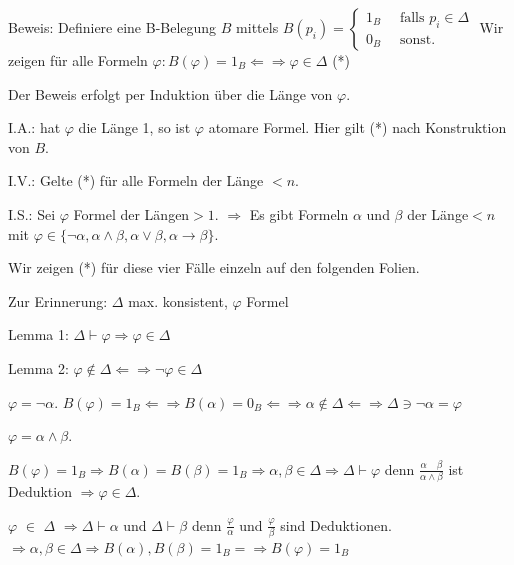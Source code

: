 \documentclass[a4paper]{article}
\begin{document}
\begin{multicols}{3}
  Beweis: Definiere eine B-Belegung $B$ mittels
  $B(p_i) = \begin{cases} 1_B \quad\text{ falls } p_i\in\Delta \\ 0_B \quad\text{ sonst. } \end{cases}$
  Wir zeigen für alle Formeln
  $\varphi: B(\varphi) = 1_B \Leftarrow\Rightarrow\varphi\in\Delta$ (*)

  Der Beweis erfolgt per Induktion über die Länge von $\varphi$.

  \begin{enumerate*}
    \itemsep1pt\parskip0pt
    \item
          I.A.: hat $\varphi$ die Länge 1, so ist $\varphi$ atomare Formel. Hier
          gilt (*) nach Konstruktion von $B$.
    \item
          I.V.: Gelte (*) für alle Formeln der Länge $<n$.
    \item
          I.S.: Sei $\varphi$ Formel der Längen$>1$. $\Rightarrow$ Es gibt
          Formeln $\alpha$ und $\beta$ der Länge$<n$ mit
          $\varphi\in\{\lnot\alpha,\alpha\wedge\beta,\alpha\vee\beta,\alpha\rightarrow\beta\}$.

          \begin{itemize*}
            \item
                  Wir zeigen (*) für diese vier Fälle einzeln auf den folgenden
                  Folien.
            \item
                  Zur Erinnerung: $\Delta$ max. konsistent, $\varphi$ Formel
            \item
                  Lemma 1: $\Delta\vdash\varphi\Rightarrow\varphi\in\Delta$
            \item
                  Lemma 2:
                  $\varphi\not\in\Delta\Leftarrow\Rightarrow\lnot\varphi\in\Delta$
          \end{itemize*}
    \item
          $\varphi =\lnot\alpha$.
          $B(\varphi) = 1_B \Leftarrow\Rightarrow B(\alpha) = 0_B \Leftarrow\Rightarrow \alpha\not\in\Delta\Leftarrow\Rightarrow \Delta \owns\lnot\alpha =\varphi$
    \item
          $\varphi =\alpha\wedge\beta$.
  \end{enumerate*}

  \begin{itemize*}
    \itemsep1pt\parskip0pt
    \item
          $B(\varphi) = 1_B \Rightarrow B(\alpha) =B(\beta) = 1_B \Rightarrow\alpha,\beta\in\Delta\Rightarrow\Delta\vdash\varphi$
          denn $\frac{\alpha\quad\beta}{\alpha\wedge\beta}$ ist Deduktion
          $\Rightarrow\varphi\in\Delta$.
    \item
          $\varphi$ $\in$ $\Delta$ $\Rightarrow\Delta\vdash\alpha$ und
          $\Delta\vdash\beta$ denn $\frac{\varphi}{\alpha}$ und
          $\frac{\varphi}{\beta}$ sind Deduktionen.
          $\Rightarrow\alpha,\beta\in\Delta\Rightarrow B(\alpha),B(\beta) = 1_B=\Rightarrow B(\varphi) = 1_B$
  \end{itemize*}


\end{multicols}
\end{document}
